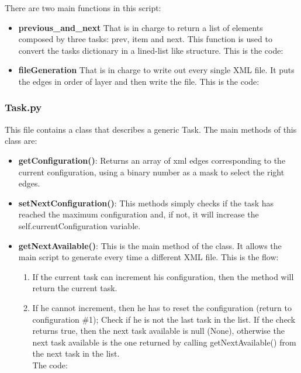 \documentclass[../main.tex]{subfiles}
\begin{document}
      
      There are two main functions in this script:
      \begin{itemize}
          \item \textbf{previous\_and\_next} That is in charge to return a list of elements composed by three tasks: prev, item and next. This function is used to convert the tasks dictionary\cite{dictionary} in a lined-list like structure.
          This is the code:
          
          \item \textbf{fileGeneration} That is in charge to write out every single XML file. It puts the edges in order of layer and then write the file. This is the code:
          
      \end{itemize}

    \subsubsection{Task.py}
      This file contains a class that describes a generic Task. The main methods of this class are:
      \begin{itemize}
        \item \textbf{getConfiguration()}: Returns an array of xml edges corresponding to the current configuration, using a binary number as a mask to select the right edges.
        
        \item \textbf{setNextConfiguration()}: This methods simply checks if the task has reached the maximum configuration and, if not, it will increase the self.currentConfiguration variable.
        \item \textbf{getNextAvailable()}: This is the main method of the class. It allows the main script to generate every time a different XML file.
        This is the flow:
        \begin{enumerate}
          \item If the current task can increment his configuration, then the method will return the current task.
          \item If he cannot increment, then he has to reset the configuration (return to configuration \#1); Check if he is not the last task in the list. If the check returns true, then the next task available is null (None), otherwise the next task available is the one returned by calling getNextAvailable() from the next task in the list.\\
          The code:
          
        \end{enumerate}
      \end{itemize}
\end{document}
